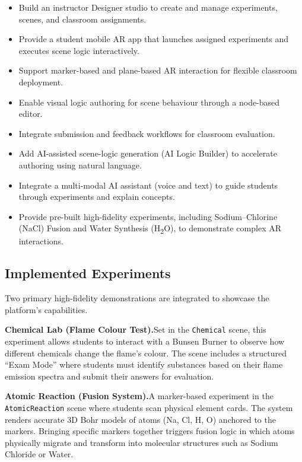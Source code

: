 \documentclass[12pt,a4paper]{article}
\begin{document}
\begin{itemize}[leftmargin=1.4cm]
  \item Build an instructor Designer studio to create and manage experiments, scenes,
        and classroom assignments.
  \item Provide a student mobile AR app that launches assigned experiments and executes
        scene logic interactively.
  \item Support marker-based and plane-based AR interaction for flexible classroom deployment.
  \item Enable visual logic authoring for scene behaviour through a node-based editor.
  \item Integrate submission and feedback workflows for classroom evaluation.
  \item Add AI-assisted scene-logic generation (AI Logic Builder) to accelerate authoring
        using natural language.
  \item Integrate a multi-modal AI assistant (voice and text) to guide students through
        experiments and explain concepts.
  \item Provide pre-built high-fidelity experiments, including Sodium--Chlorine (NaCl)
        Fusion and Water Synthesis (H\textsubscript{2}O), to demonstrate complex AR
        interactions.
\end{itemize}

\subsection{Implemented Experiments}

Two primary high-fidelity demonstrations are integrated to showcase the platform's
capabilities.

\textbf{Chemical Lab (Flame Colour Test).}\quad Set in the \texttt{Chemical} scene, this
experiment allows students to interact with a Bunsen Burner to observe how different
chemicals change the flame's colour. The scene includes a structured ``Exam Mode'' where
students must identify substances based on their flame emission spectra and submit their
answers for evaluation.

\textbf{Atomic Reaction (Fusion System).}\quad A marker-based experiment in the
\texttt{AtomicReaction} scene where students scan physical element cards. The system
renders accurate 3D Bohr models of atoms (Na, Cl, H, O) anchored to the markers.
Bringing specific markers together triggers fusion logic in which atoms physically
migrate and transform into molecular structures such as Sodium Chloride or Water.
\end{document}
